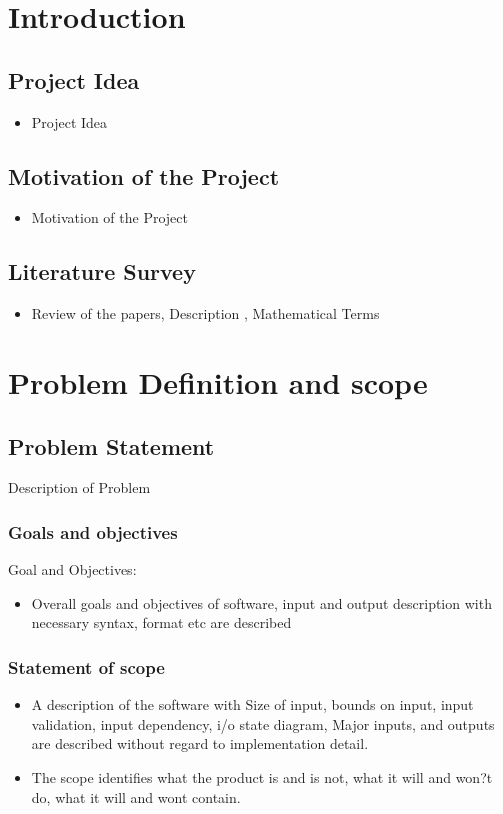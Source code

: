 \documentclass[oneside,a4paper,12pt]{report}
\begin{document}
\chapter{Introduction}
\section{Project Idea}
\begin{itemize}
\item Project Idea
\end{itemize}


\section{Motivation of the Project}  
\begin{itemize}
\item Motivation of the Project
\end{itemize}

\section{Literature Survey}
\begin{itemize}
\item Review of the papers, Description , Mathematical Terms 
\end{itemize}


\chapter{Problem Definition and scope}
\section{Problem Statement}
Description of Problem


\subsection{Goals and objectives}  
Goal and Objectives: 
\begin{itemize}
  	\item Overall goals and objectives of software, input and output description with necessary syntax, format etc are described
\end{itemize}

 \subsection{Statement of scope} 
	\begin{itemize}  
	\item	A description of the software with Size of input, bounds on input, input validation, input dependency, i/o state diagram, Major inputs, and outputs are described without regard to implementation detail.
	\item The scope identifies what the product is and is not, what it will and won?t do, what it will and wont contain.
	\end{itemize}
\end{document}
